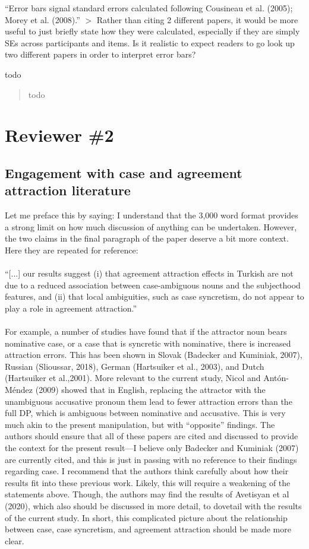 \documentclass{ar2rc}
\begin{document}
\RC ``Error bars signal standard errors calculated following Cousineau et al. (2005); Morey et al. (2008).'' $>$ Rather than citing 2 different papers, it would be more useful to just briefly state how they were calculated, especially if they are simply SEs across participants and items. Is it realistic to expect readers to go look up two different papers in order to interpret error bars?

\AC todo

\begin{quote}
    todo 
\end{quote}


\section{Reviewer \#2}

\subsection{Engagement with case and agreement attraction literature}

\RC Let me preface this by saying: I understand that the 3,000 word format provides a strong limit on how much discussion of anything can be undertaken. However, the two claims in the final paragraph of the paper deserve a bit more context. Here they are repeated for reference:\\\\
``[...] our results suggest (i) that agreement attraction effects in Turkish are not due to a reduced association between case-ambiguous nouns and the subjecthood features, and (ii) that local ambiguities, such as case syncretism, do not appear to play a role in agreement attraction.''\\\\
For example, a number of studies have found that if the attractor noun bears nominative case, or a case that is syncretic with nominative, there is increased attraction errors. This has been shown in Slovak (Badecker and Kuminiak, 2007), Russian (Slioussar, 2018), German (Hartsuiker et al., 2003), and Dutch (Hartsuiker et al.,2001). More relevant to the current study, Nicol and Antón-Méndez (2009) showed that in English, replacing the attractor with the unambiguous accusative pronoun them lead to fewer attraction errors than the full DP, which is ambiguous between nominative and accusative. This is very much akin to the present manipulation, but with ``opposite'' findings. The authors should ensure that all of these papers are cited and discussed to provide the context for the present result—I believe only Badecker and Kuminiak (2007) are currently cited, and this is just in passing with no reference to their findings regarding case. I recommend that the authors think carefully about how their results fit into these previous work. Likely, this will require a weakening of the statements above. Though, the authors may find the results of Avetisyan et al (2020), which also should be discussed in more detail, to dovetail with the results of the current study. In short, this complicated picture about the relationship between case, case syncretism, and agreement attraction should be made more clear.
\end{document}
